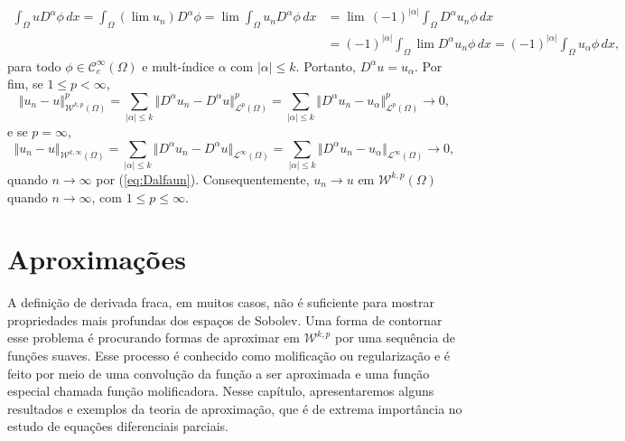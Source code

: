 \documentclass[a4paper, 11pt]{book}
\theoremstyle{definition}
\newcommand{\cC}{\mathcal{C}}
\newcommand{\cL}{\mathcal{L}}
\newcommand{\cW}{\mathcal{W}}
\begin{document}
\begin{prf}
\[\begin{aligned}
            \int_\Omega u D^\alpha \phi \, dx 
            = \int_\Omega (\lim u_n) D^\alpha \phi 
            = \lim\! \int_\Omega u_n D^\alpha \phi \,dx
            &= \lim\, (-1)^{|\alpha|}\!\int_\Omega  D^\alpha u_n \phi\,dx \\
            &= (-1)^{|\alpha|}\!\int_\Omega \lim D^\alpha u_n \phi \,dx 
            = (-1)^{|\alpha|}\!\int_\Omega u_\alpha \phi \,dx,
        \end{aligned}
    \]
    para todo $\phi \in \cC^{\infty}_c(\Omega)$ e mult-índice $\alpha$ com $|\alpha| \leqslant k$.
    Portanto, $D^\alpha u = u_\alpha$.
    Por fim, se $1 \leqslant p < \infty$,
    \[
        \Vert u_n - u \Vert_{\cW^{k,p}(\Omega)}^p = \sum_{|\alpha| \leqslant k} \Vert D^\alpha u_n - D^\alpha u \Vert_{\cL^p(\Omega)}^p = \sum_{|\alpha| \leqslant k} \Vert D^\alpha u_n - u_\alpha \Vert_{\cL^p(\Omega)}^p \to 0,
    \]
    e se $p = \infty$,
    \[
        \Vert u_n - u \Vert_{\cW^{k,\infty}(\Omega)} = \sum_{|\alpha| \leqslant k} \Vert D^\alpha u_n - D^\alpha u \Vert_{\cL^\infty(\Omega)} = \sum_{|\alpha| \leqslant k} \Vert D^\alpha u_n - u_\alpha \Vert_{\cL^\infty(\Omega)} \to 0,
    \]
    quando $n \to \infty$ por (\ref{eq:Dalfaun}).
    Consequentemente, $u_n \to u$ em $\cW^{k,p}(\Omega)$ quando $n \to \infty$, com $1 \leqslant p \leqslant \infty$.
\end{prf}

\section{Aproximações} \label{sec:aproximacoes}


A definição de derivada fraca, em muitos casos, não é suficiente para mostrar propriedades mais profundas dos espaços de Sobolev.
Uma forma de contornar esse problema é procurando formas de aproximar em $\cW^{k,p}$ por uma sequência de funções suaves.
Esse processo é conhecido como molificação ou regularização e é feito por meio de uma convolução da função a ser aproximada e uma função especial chamada função molificadora. 
Nesse capítulo, apresentaremos alguns resultados e exemplos da teoria de aproximação, que é de extrema importância no estudo de equações diferenciais parciais.
\end{document}
